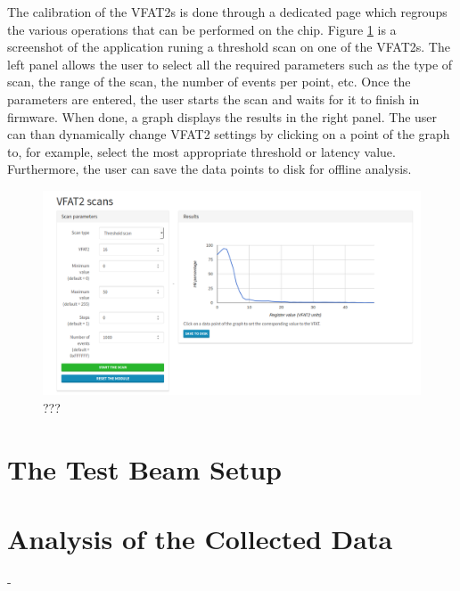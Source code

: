       The calibration of the VFAT2s is done through a dedicated page which regroups the various operations that can be performed on the chip. Figure \ref{fig:II-3-app-calibration} is a screenshot of the application runing a threshold scan on one of the VFAT2s. The left panel allows the user to select all the required parameters such as the type of scan, the range of the scan, the number of events per point, etc. Once the parameters are entered, the user starts the scan and waits for it to finish in firmware. When done, a graph displays the results in the right panel. The user can than dynamically change VFAT2 settings by clicking on a point of the graph to, for example, select the most appropriate threshold or latency value. Furthermore, the user can save the data points to disk for offline analysis.

      \begin{figure}[h!]
        \centering
        \includegraphics[width=\textwidth]{img/II-3-test-beam/app-scan.png}
        \caption{???}
        \label{fig:II-3-app-calibration}
      \end{figure}


  \section{The Test Beam Setup}

  \section{Analysis of the Collected Data}



























  -
